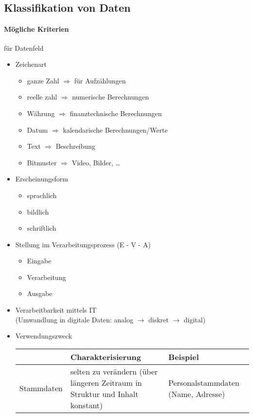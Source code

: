 \subsection{Klassifikation von Daten}
\paragraph{Mögliche Kriterien} für Datenfeld
\begin{itemize}
\item Zeichenart
\begin{itemize}
\item ganze Zahl $\Rightarrow$ für Aufzählungen
\item reelle zahl $\Rightarrow$ numerische Berechnungen
\item Währung $\Rightarrow$ finanztechnische Berechnungen
\item Datum $\Rightarrow$ kalendarische Berechnungen/Werte
\item Text $\Rightarrow$ Beschreibung
\item Bitmuster $\Rightarrow$ Video, Bilder, …
\end{itemize}
\item Erscheinungsform
\begin{itemize}
\item sprachlich
\item bildlich
\item schriftlich
\end{itemize}
\item Stellung im Verarbeitungsprozess (E - V - A)
\begin{itemize}
\item Eingabe
\item Verarbeitung
\item Ausgabe
\end{itemize}
\item Verarbeitbarkeit mittels IT\\
(Umwandlung in digitale Daten: analog $\rightarrow$ diskret $\rightarrow$ digital)
\item Verwendungszweck\\
\begin{tabular}{
p{} | >{\raggedright}
p{} | >{\raggedright}
p{}}
& Charakterisierung & Beispiel\tabularnewline
\hline
Stammdaten & selten zu verändern (über längeren Zeitraum in Struktur und Inhalt konstant) & Personalstammdaten (Name, Adresse)\tabularnewline

\end{tabular}
\end{itemize}
